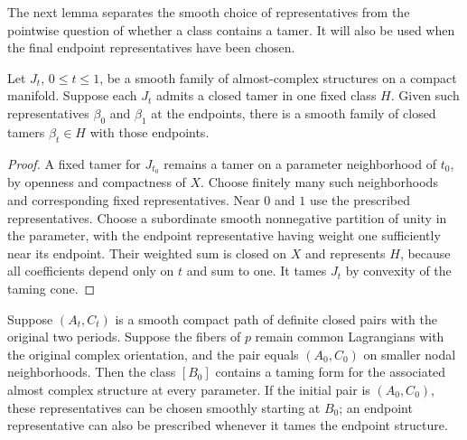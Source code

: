 The next lemma separates the smooth choice of representatives from the
pointwise question of whether a class contains a tamer.  It will also
be used when the final endpoint representatives have been chosen.

\begin{lemma}\label{lem:smooth-tamers}
Let $J_t$, $0\le t\le1$, be a smooth family of almost-complex
structures on a compact manifold. Suppose each $J_t$ admits a closed
tamer in one fixed class $H$. Given such representatives $\beta_0$
and $\beta_1$ at the endpoints, there is a smooth family of closed
tamers $\beta_t\in H$ with those endpoints.
\end{lemma}

\begin{proof}
A fixed tamer for $J_{t_0}$ remains a tamer on a parameter neighborhood
of $t_0$, by openness and compactness of $X$. Choose finitely many
such neighborhoods and corresponding fixed representatives. Near
$0$ and $1$ use the prescribed representatives. Choose a subordinate
smooth nonnegative partition of unity in the parameter, with the
endpoint representative having weight one sufficiently near its
endpoint. Their weighted sum is closed on $X$ and represents $H$,
because all coefficients depend only on $t$ and sum to one. It tames
$J_t$ by convexity of the taming cone.
\end{proof}

\begin{lemma}\label{lem:regular-tamer-path}
Suppose $(A_t,C_t)$ is a smooth compact path of definite closed pairs
with the original two periods.  Suppose the fibers of $p$ remain common
Lagrangians with the original complex orientation, and the pair equals $(A_0,C_0)$ on smaller nodal neighborhoods.  Then the class $[B_0]$
contains a taming form for the associated almost complex structure at
every parameter.  If the initial pair is $(A_0,C_0)$, these representatives
can be chosen smoothly starting at $B_0$; an endpoint representative
can also be prescribed whenever it tames the endpoint structure.
\end{lemma}

